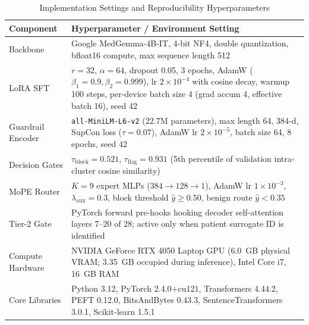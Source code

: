 \documentclass[lettersize,journal]{IEEEtran}
\begin{document}
\begin{table}[!t]
\caption{Implementation Settings and Reproducibility Hyperparameters\label{tab:impl}}
\centering
\small
\begin{tabular}{|p{0.85in}|p{2.2in}|}
\hline
\textbf{Component} & \textbf{Hyperparameter / Environment Setting}\\
\hline
Backbone & Google MedGemma-4B-IT, 4-bit NF4, double quantization, bfloat16 compute, max sequence length 512\\
\hline
LoRA SFT & $r=32$, $\alpha=64$, dropout 0.05, 3 epochs, AdamW ($\beta_1=0.9, \beta_2=0.999$), lr $2\times10^{-4}$ with cosine decay, warmup 100 steps, per-device batch size 4 (grad accum 4, effective batch 16), seed 42\\
\hline
Guardrail Encoder & \texttt{all-MiniLM-L6-v2} (22.7M parameters), max length 64, 384-d, SupCon loss ($\tau=0.07$), AdamW lr $2\times10^{-5}$, batch size 64, 8 epochs, seed 42\\
\hline
Decision Gates & $\tau_{\mathrm{block}}=0.521$, $\tau_{\mathrm{flag}}=0.931$ (5th percentile of validation intra-cluster cosine similarity)\\
\hline
MoPE Router & $K=9$ expert MLPs ($384\!\to\!128\!\to\!1$), AdamW lr $1\times10^{-3}$, $\lambda_{\mathrm{aux}}=0.3$, block threshold $\hat{y}\ge0.50$, benign route $\hat{y}<0.35$\\
\hline
Tier-2 Gate & PyTorch forward pre-hooks hooking decoder self-attention layers 7--20 of 28; active only when patient surrogate ID is identified\\
\hline
Compute Hardware & NVIDIA GeForce RTX 4050 Laptop GPU (6.0~GB physical VRAM; 3.35~GB occupied during inference), Intel Core i7, 16~GB RAM\\
\hline
Core Libraries & Python 3.12, PyTorch 2.4.0+cu121, Transformers 4.44.2, PEFT 0.12.0, BitsAndBytes 0.43.3, SentenceTransformers 3.0.1, Scikit-learn 1.5.1\\
\hline
\end{tabular}
\end{table}
\end{document}
